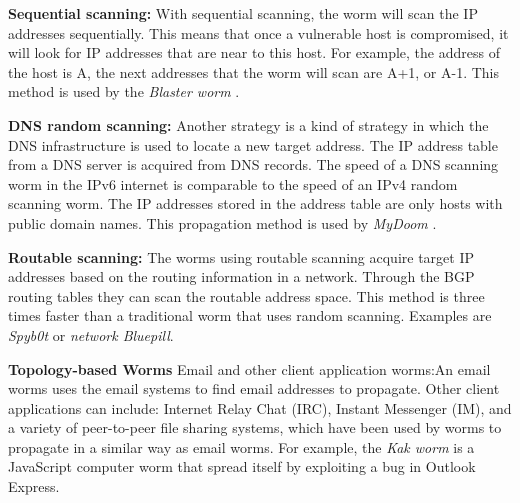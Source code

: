 \begin{description}
\item \textbf{Sequential scanning:}
With sequential scanning, the worm will scan the IP addresses sequentially. This means that once a vulnerable host is compromised, it will look for IP addresses that are near to this host. For example, the address of the host is A, the next addresses that the worm will scan are A+1, or A-1. This method is used by the \textit{Blaster worm} \citep{zou2006performance}.

\item \textbf{DNS random scanning:} Another strategy is a kind of strategy in which the DNS infrastructure is used to locate a new target address. The IP address table from a DNS server is acquired from DNS records. 
The speed of a DNS scanning worm in the IPv6 internet is comparable to the speed of an IPv4 random scanning worm. 
The IP addresses stored in the address table are only hosts with public domain names. This propagation method is used by \textit{MyDoom} \citep{kamra2005effect}.

\item \textbf{Routable scanning:} The worms using routable scanning acquire target IP addresses based on the routing information in a network. Through  the BGP routing tables they can scan the routable address space. This method is three times faster than a traditional worm that uses random scanning. Examples are \textit{Spyb0t} or \textit{network Bluepill}. 

\item \textbf{Topology-based Worms} Email and other client application worms:An email worms uses the email systems to find email addresses to propagate. Other client applications can include: Internet Relay Chat (IRC), Instant Messenger (IM), and a variety of peer-to-peer
file sharing systems, which have been used by worms to propagate in a similar way as email worms. For example, the \textit{Kak worm} \citep{Kakworm} is a JavaScript computer worm that spread itself by exploiting a bug in Outlook Express. %


\end{description}
